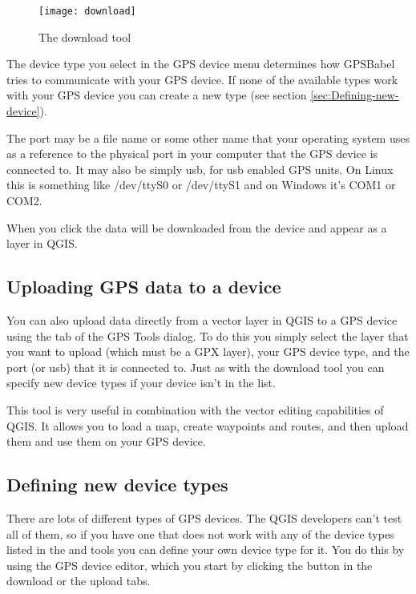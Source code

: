 \begin{figure}[ht]
   \centering
   \texttt{[image: download]}
   \caption{\label{figure_download}The download tool \nixcaption}
\end{figure}

The device type you select in the GPS device menu determines how GPSBabel tries to communicate with your GPS device.
If none of the available types work with your GPS device you can create a new type (see section \ref{sec:Defining-new-device}).

The port may be a file name or some other name that your operating system uses as a reference to the physical port in your computer that the GPS device is connected to. It may also be simply usb, for usb enabled GPS units.
\nix On Linux this is something like /dev/ttyS0 or /dev/ttyS1 and on \win Windows it's COM1 or COM2.

When you click  the data will be downloaded from the device and appear as a layer in QGIS.

\subsection{Uploading GPS data to a device}

You can also upload data directly from a vector layer in QGIS to a GPS device using the  tab of the GPS Tools dialog. To do this you simply select the layer that you want to upload (which must be a GPX layer), 
your GPS device type, and the port (or usb) that it is connected to.
Just as with the download tool you can specify new device types if your device isn't in the list.

This tool is very useful in combination with the vector editing capabilities of QGIS. It allows you to load a map, create waypoints and routes, and then upload them and use them on your GPS device.

\subsection{\label{sec:Defining-new-device}Defining new device types}

There are lots of different types of GPS devices.
The QGIS developers can't test all of them, so if you have one that does not work with any of the device types listed in the  and  tools you can define your own device type for it.
You do this by using the GPS device editor, which you start by clicking the  button in the download or the upload tabs.

